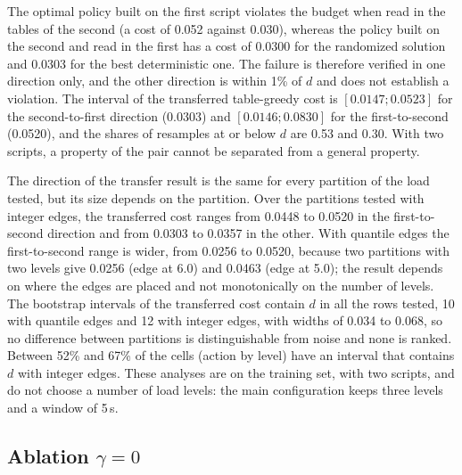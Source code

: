 The optimal policy built on the first script violates the budget when read in the tables of the second (a cost of 0.052 against 0.030), whereas the policy built on the second and read in the first has a cost of 0.0300 for the randomized solution and 0.0303 for the best deterministic one.%
The failure is therefore verified in one direction only, and the other direction is within 1\% of $d$ and does not establish a violation.%
The interval of the transferred table-greedy cost is $[0.0147;0.0523]$ for the second-to-first direction (0.0303) and $[0.0146;0.0830]$ for the first-to-second (0.0520), and the shares of resamples at or below $d$ are 0.53 and 0.30.%
With two scripts, a property of the pair cannot be separated from a general property.%

The direction of the transfer result is the same for every partition of the load tested, but its size depends on the partition.%
Over the partitions tested with integer edges, the transferred cost ranges from 0.0448 to 0.0520 in the first-to-second direction and from 0.0303 to 0.0357 in the other.%
With quantile edges the first-to-second range is wider, from 0.0256 to 0.0520, because two partitions with two levels give 0.0256 (edge at 6.0) and 0.0463 (edge at 5.0); the result depends on where the edges are placed and not monotonically on the number of levels.%
The bootstrap intervals of the transferred cost contain $d$ in all the rows tested, 10 with quantile edges and 12 with integer edges, with widths of 0.034 to 0.068, so no difference between partitions is distinguishable from noise and none is ranked.%
Between 52\% and 67\% of the cells (action by level) have an interval that contains $d$ with integer edges.%
These analyses are on the training set, with two scripts, and do not choose a number of load levels: the main configuration keeps three levels and a window of 5\,s.%

\subsection{Ablation $\gamma=0$}
\label{sec:res_gamma}

